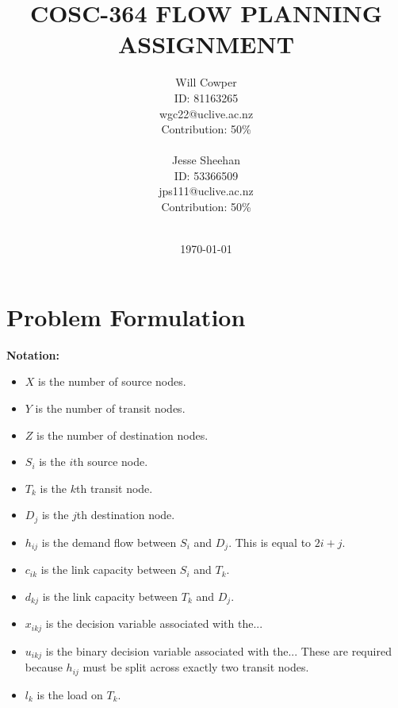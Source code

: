 \documentclass[12pt]{article} %
\title{\uppercase{
	COSC-364 Flow Planning Assignment
}}
\date{\today}
\author{
	Will Cowper\\
	{\small{ID: 81163265}}\\
	{\small{wgc22@uclive.ac.nz}}\\
	{\small{Contribution: 50\%}}\\
	\\
	Jesse Sheehan\\
	{\small{ID: 53366509}}\\
	{\small{jps111@uclive.ac.nz}}\\
	{\small{Contribution: 50\%}}\\
	\\
}
\begin{document}
\maketitle

\newpage

\section{Problem Formulation}



\noindent \textbf{Notation:}
\begin{itemize}
\item $X$ is the number of source nodes.
\item $Y$ is the number of transit nodes.
\item $Z$ is the number of destination nodes.
\item $S_i$ is the $i$th source node.
\item $T_k$ is the $k$th transit node.
\item $D_j$ is the $j$th destination node.
\item $h_{ij}$ is the demand flow between $S_i$ and $D_j$. This is equal to $2i + j$.
\item $c_{ik}$ is the link capacity between $S_i$ and $T_k$.
\item $d_{kj}$ is the link capacity between $T_k$ and $D_j$.
\item $x_{ikj}$ is the decision variable associated with the...
\item $u_{ikj}$ is the binary decision variable associated with the... These are required because $h_{ij}$ must be split across exactly two transit nodes.
\item $l_{k}$ is the load on $T_k$.
\end{itemize}
\end{document}
